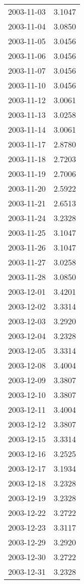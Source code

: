 \begin{tabular}{lr}
2003-11-03 &      3.1047 \\
2003-11-04 &      3.0850 \\
2003-11-05 &      3.0456 \\
2003-11-06 &      3.0456 \\
2003-11-07 &      3.0456 \\
2003-11-10 &      3.0456 \\
2003-11-12 &      3.0061 \\
2003-11-13 &      3.0258 \\
2003-11-14 &      3.0061 \\
2003-11-17 &      2.8780 \\
2003-11-18 &      2.7203 \\
2003-11-19 &      2.7006 \\
2003-11-20 &      2.5922 \\
2003-11-21 &      2.6513 \\
2003-11-24 &      3.2328 \\
2003-11-25 &      3.1047 \\
2003-11-26 &      3.1047 \\
2003-11-27 &      3.0258 \\
2003-11-28 &      3.0850 \\
2003-12-01 &      3.4201 \\
2003-12-02 &      3.3314 \\
2003-12-03 &      3.2920 \\
2003-12-04 &      3.2328 \\
2003-12-05 &      3.3314 \\
2003-12-08 &      3.4004 \\
2003-12-09 &      3.3807 \\
2003-12-10 &      3.3807 \\
2003-12-11 &      3.4004 \\
2003-12-12 &      3.3807 \\
2003-12-15 &      3.3314 \\
2003-12-16 &      3.2525 \\
2003-12-17 &      3.1934 \\
2003-12-18 &      3.2328 \\
2003-12-19 &      3.2328 \\
2003-12-22 &      3.2722 \\
2003-12-23 &      3.3117 \\
2003-12-29 &      3.2920 \\
2003-12-30 &      3.2722 \\
2003-12-31 &      3.2328 \\

\end{tabular}
